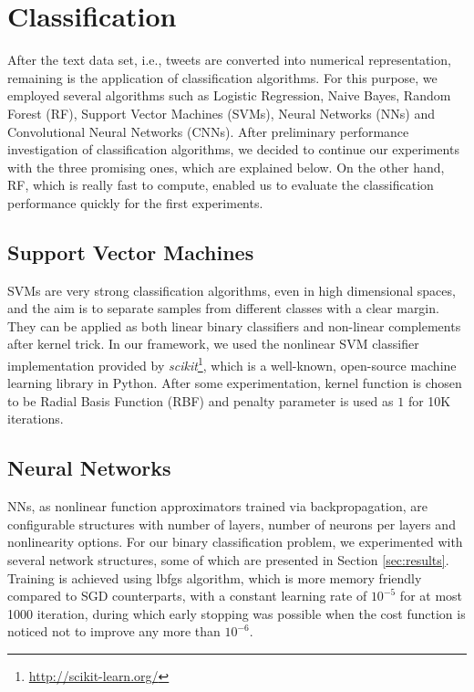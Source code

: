 \section{Classification}
\label{sec:modelSelection}
After the text data set, i.e., tweets are converted into numerical representation, remaining is the application of classification algorithms.
For this purpose, we employed several algorithms such as Logistic Regression, Naive Bayes, Random Forest (RF), Support Vector Machines (SVMs), Neural Networks (NNs) and Convolutional Neural Networks (CNNs).
After preliminary performance investigation of classification algorithms, we decided to continue our experiments with the three promising ones, which are explained below.
On the other hand, RF, which is really fast to compute, enabled us to evaluate the classification performance quickly for the first experiments.

\subsection{Support Vector Machines}
SVMs are very strong classification algorithms, even in high dimensional spaces, and the aim is to separate samples from different classes with a clear margin.
They can be applied as both linear binary classifiers and non-linear complements after kernel trick.
In our framework, we used the nonlinear SVM classifier implementation provided by \textit{scikit}\footnote{\url{http://scikit-learn.org/}}, which is a well-known, open-source machine learning library in Python.
After some experimentation, kernel function is chosen to be Radial Basis Function (RBF) and penalty parameter is used as $1$ for 10K iterations.


\subsection{Neural Networks}
NNs, as nonlinear function approximators trained via backpropagation, are configurable structures with number of layers, number of neurons per layers and nonlinearity options.
For our binary classification problem, we experimented with several network structures, some of which are presented in Section \ref{sec:results}.
Training is achieved using lbfgs algorithm, which is more memory friendly compared to SGD counterparts, with a constant learning rate of $10^{-5}$ for at most 1000 iteration, during which early stopping was possible when the cost function is noticed not to improve any more than $10^{-6}$.

